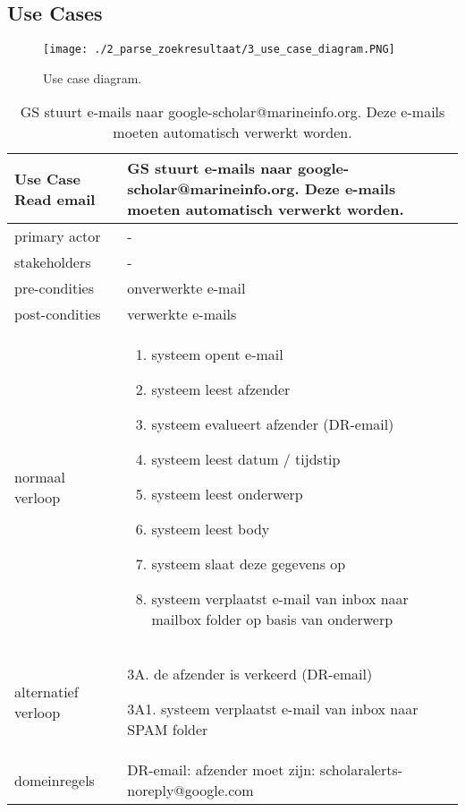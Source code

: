 \subsection{Use Cases}
\begin{figure}[h!]
    \centering
    \texttt{[image: ./2\_parse\_zoekresultaat/3\_use\_case\_diagram.PNG]}
    \caption[Use case diagram.]{\label{fig:Use case diagram}Use case diagram.}
\end{figure}
\begin{table}[ptb]
    \centering
    \begin{tabular}{ | m{5cm} | m{10cm}| } 
        \hline
        \rowcolor{lightgray}
        Use Case Read email & GS stuurt e-mails naar google-scholar@marineinfo.org. Deze e-mails moeten automatisch verwerkt worden. \\ 
        \hline
        primary actor & - \\ 
        \hline
        stakeholders & - \\ 
        \hline
        pre-condities & onverwerkte e-mail \\ 
        \hline
        post-condities & verwerkte e-mails \\ 
        \hline
        normaal verloop & 
        \begin{enumerate}
            \item systeem opent e-mail
            \item systeem leest afzender
            \item systeem evalueert afzender (DR-email)
            \item systeem leest datum / tijdstip
            \item systeem leest onderwerp
            \item systeem leest body
            \item systeem slaat deze gegevens op
            \item systeem verplaatst e-mail van inbox naar mailbox folder op basis van onderwerp
        \end{enumerate} \\ 
        \hline
        alternatief verloop & 
        \begin{description}
            \item 3A. de afzender is verkeerd (DR-email)
            \item 3A1. systeem verplaatst e-mail van inbox naar SPAM folder
        \end{description} \\ 
        \hline
        domeinregels & DR-email: afzender moet zijn: scholaralerts-noreply@google.com \\ 
        \hline
    \end{tabular}
    \caption{GS stuurt e-mails naar google-scholar@marineinfo.org. Deze e-mails moeten automatisch verwerkt worden.}
\end{table}

